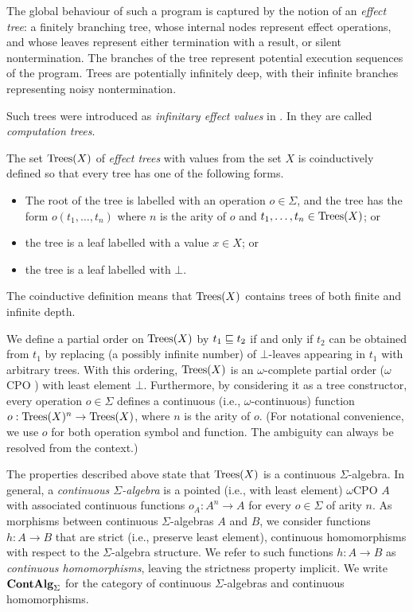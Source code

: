 The global behaviour of such a program is captured by the notion of an
\emph{effect tree}: a  finitely branching tree, whose internal nodes represent
effect operations, and whose leaves represent either termination with a result,
or silent nontermination. The branches of the tree represent potential execution
sequences of the program.  Trees are potentially infinitely deep, with their
infinite branches representing noisy nontermination.

Such trees were introduced as \emph{infinitary effect values} in  \cite{plotkin2001adequacy}. In \cite{com} they are called
\emph{computation trees}.


The set $\textnormal{Trees}(X)$ of \emph{effect trees} with values from  the set $X$ is coinductively defined so that
every tree has one of the following  forms.
\begin{itemize}
\item The root of the tree is labelled with an operation $o \in \Sigma$, and the tree has the form
         $o(t_1, \dots, t_n)$ where $n$ is the arity of $o$ and $t_1, \dots, t_n \in \textnormal{Trees}(X)$; or
\item the tree is a leaf labelled with a value $x \in X$; or
\item the tree is a leaf labelled with $\bot$.
\end{itemize}
The coinductive definition means that $\textnormal{Trees}(X)$ contains trees of both finite and infinite depth.

We define a partial order on  $\textnormal{Trees}(X)$ by
$t_1 \sqsubseteq t_2$ if and only if $t_2$ can be obtained from $t_1$ by replacing (a possibly infinite number)
of $\bot$-leaves appearing in $t_1$ with arbitrary trees. With this ordering,  $\textnormal{Trees}(X)$  is an $\omega$-complete 
partial order ($\omega$CPO ) with least element $\bot$. Furthermore, by considering it as
a tree constructor,
every operation $o \in \Sigma$  defines a continuous (i.e., $\omega$-continuous) function $o : \textnormal{Trees}(X)^n \to \textnormal{Trees}(X)$, where $n$ is the arity of $o$.
(For notational convenience, we use $o$ for both operation symbol and function. The ambiguity can always be resolved from the context.) 

The properties described above state that $\textnormal{Trees}(X)$ is a continuous $\Sigma$-algebra. In general,
a \emph{continuous $\Sigma$-algebra} is a pointed (i.e., with least element) $\omega$CPO $A$ with associated
continuous functions $o_A : A^n \to A$ for every $o \in \Sigma$ of arity $n$. 
As morphisms between continuous $\Sigma$-algebras
$A$ and $B$, we consider functions $h: A \to B$  that are strict (i.e., preserve least element), continuous homomorphisms with respect to the $\Sigma$-algebra structure. 
We refer to such  functions $h: A \to B$ as \emph{continuous homomorphisms}, leaving the strictness property implicit.
We write $\mathbf{ContAlg}_\Sigma$ for the category of continuous $\Sigma$-algebras and continuous homomorphisms.

